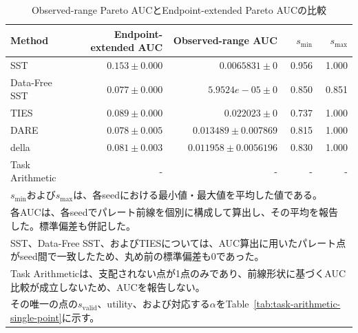 \begin{table}[H]
\centering
\caption{Observed-range Pareto AUCとEndpoint-extended Pareto AUCの比較}
\label{tab:auc_no_interpolation}
\small
\begin{tabular}{lrrrr}
\toprule
Method & Endpoint-extended AUC & Observed-range AUC & \(s_{\min}\) & \(s_{\max}\) \\
\midrule
SST & $0.153 \pm 0.000$ & $0.0065831 \pm 0$ & 0.956 & 1.000 \\
Data-Free SST & $0.077 \pm 0.000$ & $5.9524e-05 \pm 0$ & 0.850 & 0.851 \\
TIES & $0.089 \pm 0.000$ & $0.022023 \pm 0$ & 0.737 & 1.000 \\
DARE & $0.078 \pm 0.005$ & $0.013489 \pm 0.007869$ & 0.815 & 1.000 \\
della & $0.081 \pm 0.003$ & $0.011958 \pm 0.0056196$ & 0.830 & 1.000 \\
Task Arithmetic & - & - & - & - \\
\bottomrule
\multicolumn{5}{l}{\footnotesize \(s_{\min}\)および\(s_{\max}\)は、各seedにおける最小値・最大値を平均した値である。} \\
\multicolumn{5}{l}{\footnotesize 各AUCは、各seedでパレート前線を個別に構成して算出し、その平均を報告した。標準偏差も併記した。} \\
\multicolumn{5}{l}{\footnotesize SST、Data-Free SST、およびTIESについては、AUC算出に用いたパレート点がseed間で一致したため、丸め前の標準偏差も0であった。} \\
\multicolumn{5}{l}{\footnotesize Task Arithmeticは、支配されない点が1点のみであり、前線形状に基づくAUC比較が成立しないため、AUCを報告しない。} \\
\multicolumn{5}{l}{\footnotesize その唯一の点の\(s_{\mathrm{valid}}\)、utility、および対応する\(\alpha\)をTable~\ref{tab:task-arithmetic-single-point}に示す。} \\
\end{tabular}
\end{table}